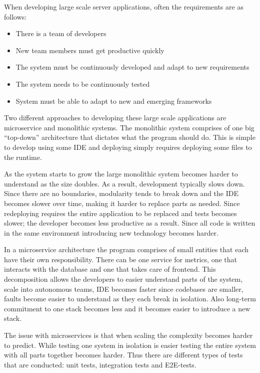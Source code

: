 When developing large scale server applications, often the requirements are as
follows:

\begin{itemize}
    \item There is a team of developers
    \item New team members must get productive quickly
    \item The system must be continuously developed and adapt to new
        requirements
    \item The system needs to be continuously tested
    \item System must be able to adapt to new and emerging frameworks
\end{itemize}

Two different approaches to developing these large scale applications are
microservice and monolithic systems. The monolithic system comprises of one big
``top-down'' architecture that dictates what the program should do. This is
simple to develop using some IDE and deploying simply requires deploying some
files to the runtime. 

As the system starts to grow the large monolithic system becomes harder to
understand as the size doubles. As a result, development typically slows down.
Since there are no boundaries, modularity tends to break down and the IDE
becomes slower over time, making it harder to replace parts as needed. Since
redeploying requires the entire application to be replaced and tests becomes
slower; the developer becomes less productive as a result. Since all code is
written in the same environment introducing new technology becomes harder.

In a microservice architecture the program comprises of small entities that each
have their own responsibility. There can be one service for metrics, one that
interacts with the database and one that takes care of frontend. This
decomposition allows the developers to easier understand parts of the system,
scale into autonomous teams, IDE becomes faster since codebases are smaller,
faults become easier to understand as they each break in isolation.  Also
long-term commitment to one stack becomes less and it becomes easier to
introduce a new stack. 

The issue with microservices is that when scaling the complexity becomes harder
to predict. While testing one system in isolation is easier testing the entire
system with all parts together becomes harder. Thus there are different types of
tests that are conducted: unit tests, integration tests and E2E-tests.

